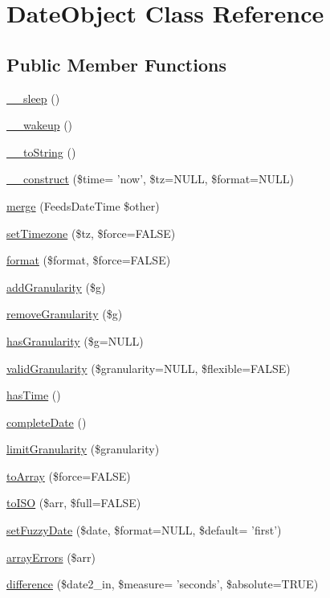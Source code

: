 \hypertarget{classDateObject}{
\section{DateObject Class Reference}
\label{classDateObject}
}
\subsection*{Public Member Functions}
\begin{DoxyCompactItemize}
\item 
\hyperlink{classDateObject_a9a90ad5b8fd69379eba62dd07e0aaa6e}{\_\-\_\-sleep} ()
\item 
\hyperlink{classDateObject_a6cd3a2ac8b0d69928ba53d04c5486435}{\_\-\_\-wakeup} ()
\item 
\hyperlink{classDateObject_ac39c3670e00202a2c3c213edbc8deec8}{\_\-\_\-toString} ()
\item 
\hyperlink{classDateObject_a51c14ca40ce3c847f12057055a7899cc}{\_\-\_\-construct} (\$time= 'now', \$tz=NULL, \$format=NULL)
\item 
\hyperlink{classDateObject_a9974bc28e7a0bc4e8fece41fa065bb53}{merge} (FeedsDateTime \$other)
\item 
\hyperlink{classDateObject_a2492f42b3e5db5668b9c3cca250767ee}{setTimezone} (\$tz, \$force=FALSE)
\item 
\hyperlink{classDateObject_ad85e273d0e5ddb394f3e3f0fcd68a19b}{format} (\$format, \$force=FALSE)
\item 
\hyperlink{classDateObject_adcf20b89e2c909ffc82567efcf7d1465}{addGranularity} (\$g)
\item 
\hyperlink{classDateObject_a46c9b0df6160a5253f90adbac4e1848f}{removeGranularity} (\$g)
\item 
\hyperlink{classDateObject_a7b8143706b36b592b071b76ddf14d9ff}{hasGranularity} (\$g=NULL)
\item 
\hyperlink{classDateObject_aa4dfd0e15b696446ac26c0a6bc5284c6}{validGranularity} (\$granularity=NULL, \$flexible=FALSE)
\item 
\hyperlink{classDateObject_aff6e57eec29c7706d59c6dc7e0d8e9f9}{hasTime} ()
\item 
\hyperlink{classDateObject_af83b95282617a2d2ec4dded415f84ed7}{completeDate} ()
\item 
\hyperlink{classDateObject_a38ea3db16bafb0f1b10acaeb0ee74f97}{limitGranularity} (\$granularity)
\item 
\hyperlink{classDateObject_a470d11f41df750e2d8ff522c33d98238}{toArray} (\$force=FALSE)
\item 
\hyperlink{classDateObject_ac98a3b4209dd6df8da10e327ff501b2e}{toISO} (\$arr, \$full=FALSE)
\item 
\hyperlink{classDateObject_a0a5d9d34e563019feb0079e89ccae619}{setFuzzyDate} (\$date, \$format=NULL, \$default= 'first')
\item 
\hyperlink{classDateObject_ad79130b614d7207bd4f93577de7d881d}{arrayErrors} (\$arr)
\item 
\hyperlink{classDateObject_a58a7653254c911f52b506e028b5bc35a}{difference} (\$date2\_\-in, \$measure= 'seconds', \$absolute=TRUE)
\end{DoxyCompactItemize}
